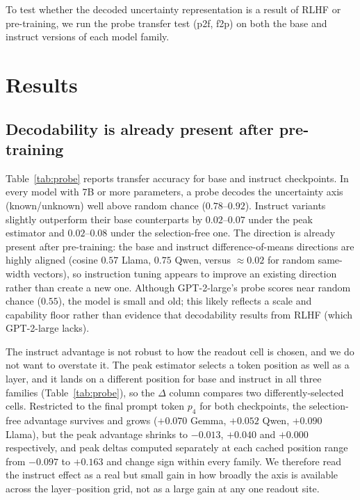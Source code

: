 \documentclass{article}
\begin{document}
To test whether the decoded uncertainty representation is a result of RLHF or pre-training, we run the probe transfer test (p2f, f2p) on both the base and instruct versions of each model family.

\section{Results}

\subsection{Decodability is already present after pre-training}
\label{sec:decode}

Table~\ref{tab:probe} reports transfer accuracy for base and instruct checkpoints. In every model with 7B or more parameters, a probe decodes the uncertainty axis (known/unknown) well above random chance ($0.78$--$0.92$). Instruct variants slightly outperform their base counterparts by $0.02$--$0.07$ under the peak estimator and $0.02$--$0.08$ under the selection-free one. The direction is already present after pre-training: the base and instruct difference-of-means directions are highly aligned (cosine $0.57$ Llama, $0.75$ Qwen, versus $\approx 0.02$ for random same-width vectors), so instruction tuning appears to improve an existing direction rather than create a new one. Although GPT-2-large's probe scores near random chance ($0.55$), the model is small and old; this likely reflects a scale and capability floor rather than evidence that decodability results from RLHF (which GPT-2-large lacks).

The instruct advantage is not robust to how the readout cell is chosen, and we do not want to overstate it. The peak estimator selects a token position as well as a layer, and it lands on a different position for base and instruct in all three families (Table~\ref{tab:probe}), so the $\Delta$ column compares two differently-selected cells. Restricted to the final prompt token $p_4$ for both checkpoints, the selection-free advantage survives and grows ($+0.070$ Gemma, $+0.052$ Qwen, $+0.090$ Llama), but the peak advantage shrinks to $-0.013$, $+0.040$ and $+0.000$ respectively, and peak deltas computed separately at each cached position range from $-0.097$ to $+0.163$ and change sign within every family. We therefore read the instruct effect as a real but small gain in how broadly the axis is available across the layer--position grid, not as a large gain at any one readout site.
\end{document}
